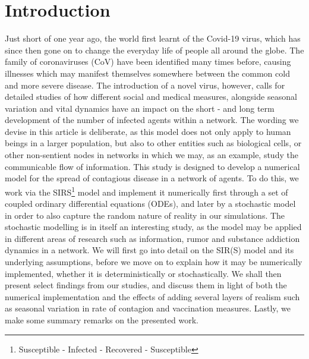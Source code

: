 \section{Introduction}
Just short of one year ago, the world first learnt of the Covid-19 virus, which has since then gone on to change the everyday life of people all around the globe. The family of coronaviruses (CoV) have been identified many times before, causing illnesses which may manifest themselves somewhere between the common cold and more severe disease. The introduction of a novel virus, however, calls for detailed studies of how different social and medical measures, alongside seasonal variation and vital dynamics have an impact on the short - and long term development of the number of infected agents within a network. The wording we devise in this article is deliberate, as this model does not only apply to human beings in a larger population, but also to other entities such as biological cells, or other non-sentient nodes in networks in which we may, as an example, study the communicable flow of information.
This study is designed to develop a numerical model for the spread of contagious disease in a network of agents. To do this, we work via the SIRS\footnote{Susceptible - Infected - Recovered - Susceptible} model and implement it numerically first through a set of coupled ordinary differential equations (ODEs), and later by a stochastic model in order to also capture the random nature of reality in our simulations. The stochastic modelling is in itself an interesting study, as the model may be applied in different areas of research such as information, rumor and substance addiction dynamics in a network. We will first go into detail on the SIR(S) model and its underlying assumptions, before we move on to explain how it may be numerically implemented, whether it is deterministically or stochastically. We shall then present select findings from our studies, and discuss them in light of both the numerical implementation and the effects of adding several layers of realism such as seasonal variation in rate of contagion and vaccination measures. Lastly, we make some summary remarks on the presented work.
\newpage